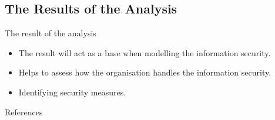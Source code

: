 \documentclass{beamer}
\begin{document}
\subsection{The Results of the Analysis}
\begin{frame}{The result of the analysis}
  \begin{itemize}
    \item The result will act as a base when modelling the information security.
    \item Helps to assess how the organisation handles the information security.
    \item Identifying security measures.
  \end{itemize}
  
\end{frame}

\begin{frame}[allowframebreaks]{References}
	\small
  \printbibliography{}
\end{frame}
\end{document}
